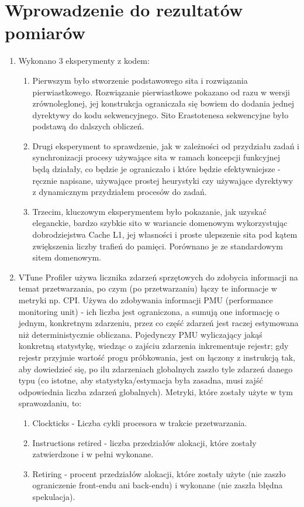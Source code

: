 \documentclass[12pt]{article}
\begin{document}
\section {Wprowadzenie do rezultatów pomiarów}
\begin{enumerate}
	\item Wykonano 3 eksperymenty z kodem:
	\begin{enumerate}

		\item Pierwszym było stworzenie podstawowego sita i rozwiązania pierwiastkowego. Rozwiązanie pierwiastkowe pokazano od razu w wersji zrównoleglonej, jej konstrukcja ograniczała się bowiem do dodania jednej dyrektywy do kodu sekwencyjnego. Sito Erastotenesa sekwencyjne było podstawą do dalszych obliczeń.

		\item Drugi eksperyment to sprawdzenie, jak w zależności od przydziału zadań i synchronizacji procesy używające sita w ramach koncepcji funkcyjnej będą działały, co będzie je ograniczało i które będzie efektywniejsze - ręcznie napisane, używające prostej heurystyki czy używające dyrektywy z dynamicznym przydziałem procesów do zadań.
		\item Trzecim, kluczowym eksperymentem było pokazanie, jak uzyskać eleganckie, bardzo szybkie sito w wariancie domenowym wykorzystując dobrodziejstwa Cache L1, jej własności i proste ulepszenie sita pod kątem zwiększenia liczby trafień do pamięci. Porównano je ze standardowym sitem domenowym.
	\end{enumerate}

	\item VTune Profiler używa licznika zdarzeń sprzętowych do zdobycia informacji na temat przetwarzania, po czym (po przetwarzaniu) łączy te informacje w metryki np. CPI. Używa do zdobywania informacji PMU (performance monitoring unit) - ich liczba jest ograniczona, a sumują one informację o jednym, konkretnym zdarzeniu, przez co część zdarzeń jest raczej estymowana niż deterministycznie obliczana. Pojedynczy PMU wyliczający jakąś konkretną statystykę, wiedząc o zajściu zdarzenia inkrementuje rejestr; gdy rejestr przyjmie wartość progu próbkowania, jest on łączony z instrukcją tak, aby dowiedzieć się, po ilu zdarzeniach globalnych zaszło tyle zdarzeń danego typu (co istotne, aby statystyka/estymacja była zasadna, musi zajść odpowiednia liczba zdarzeń globalnych). Metryki, które zostały użyte w tym sprawozdaniu, to: 
	
	\begin{enumerate}
		\item Clockticks - Liczba cykli procesora w trakcie przetwarzania.
		\item Instructions retired - liczba przedziałów alokacji, które zostały zatwierdzone i w pełni wykonane.
		\item Retiring - procent przedziałów alokacji, które zostały użyte (nie zaszło ograniczenie front-endu ani back-endu) i wykonane (nie zaszła błędna spekulacja).
		

\end{enumerate}
\end{enumerate}
\end{document}

